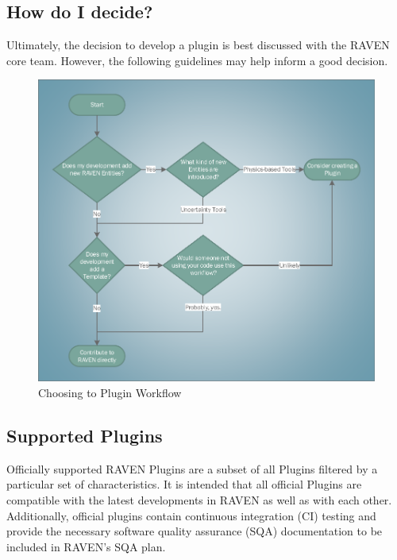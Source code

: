 \subsection{How do I decide?}

Ultimately, the decision to develop a plugin is best discussed with the RAVEN core team. However, the following guidelines may help inform a good decision.

\begin{figure}[h!]
  \centering
  \includegraphics[scale=0.7]{pics/toPluginOrNot.pdf}
  \caption{Choosing to Plugin Workflow}
  \label{fig:choose plugin}
 \end{figure}

 \subsection{Supported Plugins}

 Officially supported RAVEN Plugins are a subset of all Plugins filtered by a particular set of characteristics. It is intended that all official Plugins are compatible with the latest developments in RAVEN as well as with each other. Additionally, official plugins contain continuous integration (CI) testing and provide the necessary software quality assurance (SQA) documentation to be included in RAVEN's SQA plan.

